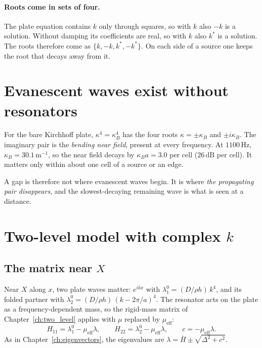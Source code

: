 \paragraph{Roots come in sets of four.} The plate equation contains $k$ only through
squares, so with $k$ also $-k$ is a solution. Without damping its coefficients are
real, so with $k$ also $k^*$ is a solution. The roots therefore come as
$\{k, -k, k^*, -k^*\}$. On each side of a source one keeps the root that decays away
from it.

\section{Evanescent waves exist without resonators}

For the bare Kirchhoff plate, $\kappa^4 = \kappa_B^4$ has the four roots
$\kappa = \pm\kappa_B$ and $\pm i\kappa_B$. The imaginary pair is the \emph{bending
near field}, present at every frequency. At $1100\,\mathrm{Hz}$,
$\kappa_B = 30.1\,\mathrm{m}^{-1}$, so the near field decays by
$\kappa_B a = 3.0$ per cell ($26\,\mathrm{dB}$ per cell). It matters only within
about one cell of a source or an edge.

A gap is therefore not where evanescent waves begin. It is where \emph{the
propagating pair disappears}, and the slowest-decaying remaining wave is what is seen
at a distance.

\section{Two-level model with complex $k$}
\label{sec:two_level_complex}

\subsection{The matrix near $X$}
Near $X$ along $x$, two plate waves matter: $e^{ikx}$ with
$\lambda_1^0 = (D/\rho h)\,k^4$, and its folded partner with
$\lambda_2^0 = (D/\rho h)\,(k - 2\pi/a)^4$. The resonator acts on the plate as a
frequency-dependent mass, so the rigid-mass matrix of Chapter~\ref{ch:two_level}
applies with $\mu$ replaced by $\mu_\mathrm{eff}$:
\begin{equation}
  H_{11} = \lambda_1^0 - \mu_\mathrm{eff}\lambda, \qquad
  H_{22} = \lambda_2^0 - \mu_\mathrm{eff}\lambda, \qquad
  c = -\mu_\mathrm{eff}\lambda .
\end{equation}
As in Chapter~\ref{ch:eigenvectors}, the eigenvalues are
$\lambda = \bar{H} \pm \sqrt{\Delta^2 + c^2}$.

